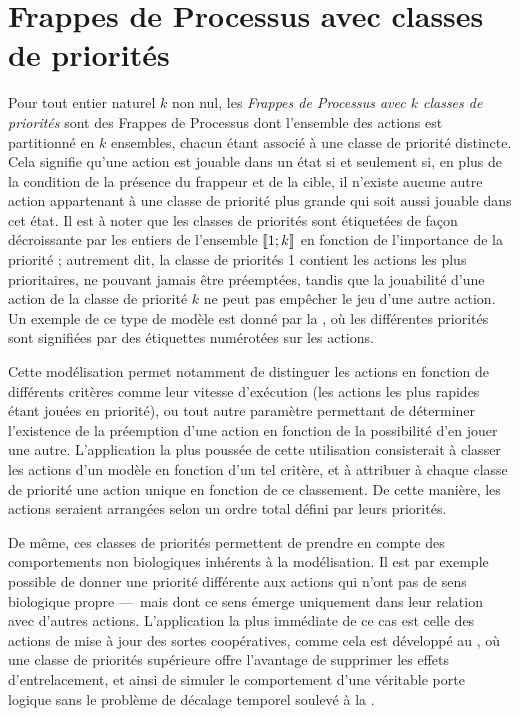 \section{Frappes de Processus avec classes de priorités}

Pour tout entier naturel $k$ non nul,
les \emph{Frappes de Processus avec $k$ classes de priorités}
sont des Frappes de Processus dont l'ensemble des actions est partitionné
en $k$ ensembles, chacun étant associé à une classe de priorité distincte.
Cela signifie qu'une action est jouable dans un état si et seulement si,
en plus de la condition de la présence du frappeur et de la cible,
il n'existe aucune autre action appartenant à une classe de priorité plus grande
qui soit aussi jouable dans cet état.
Il est à noter que les classes de priorités sont étiquetées de façon décroissante par les entiers de
l'ensemble $\mathopen{\llbracket}1\mathclose{};k\mathclose{\rrbracket}$ en fonction de l'importance de la priorité ;
autrement dit, la classe de priorités 1 contient les actions les plus prioritaires,
ne pouvant jamais être préemptées,
tandis que la jouabilité d'une action de la classe de priorité $k$ ne peut pas empêcher le jeu
d'une autre action.
Un exemple de ce type de modèle est donné par la ,
où les différentes priorités sont signifiées par des étiquettes numérotées sur les actions.

Cette modélisation permet notamment de distinguer les actions en fonction 
de différents critères comme
leur vitesse d'exécution (les actions les plus rapides étant jouées en priorité),
ou tout autre paramètre permettant de déterminer l'existence de la préemption d'une action
en fonction de la possibilité d'en jouer une autre.
L'application la plus poussée de cette utilisation consisterait à
classer les actions d'un modèle en fonction d'un tel critère,
et à attribuer à chaque classe de priorité une action unique en fonction de ce classement.
De cette manière,
les actions seraient arrangées selon un ordre total défini par leurs priorités.

De même, ces classes de priorités permettent de prendre en compte des comportements non biologiques
inhérents à la modélisation.
Il est par exemple possible de donner une priorité différente aux
actions qui n'ont pas de sens biologique propre
---~mais dont ce sens émerge uniquement dans leur relation avec d'autres actions.
L'application la plus immédiate de ce cas est celle des actions de mise à jour
des sortes coopératives, comme cela est développé au ,
où une classe de priorités supérieure offre l'avantage de supprimer les effets d'entrelacement,
et ainsi de simuler le comportement d'une véritable porte logique
sans le problème de décalage temporel soulevé à la .

